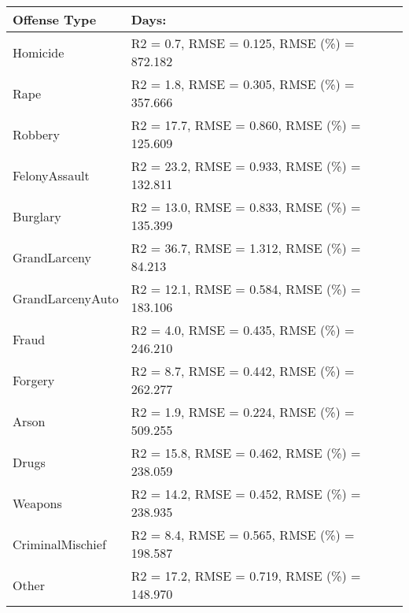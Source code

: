 \documentclass[10pt,journal,compsoc]{IEEEtran}
\begin{document}
\begin{tabular}{ |p{3cm}|p{4cm}|  }
 \hline
 Offense Type&Days:\\
  \hline
Homicide& R2 = 0.7, RMSE = 0.125, RMSE (\%) = 872.182\\
 \hline
Rape& R2 = 1.8, RMSE = 0.305, RMSE (\%) = 357.666\\
 \hline
Robbery &R2 = 17.7, RMSE = 0.860, RMSE (\%) = 125.609 \\
 \hline
FelonyAssault& R2 = 23.2, RMSE = 0.933, RMSE (\%) = 132.811\\
 \hline
Burglary &R2 = 13.0, RMSE = 0.833, RMSE (\%) = 135.399\\
 \hline
GrandLarceny &R2 = 36.7, RMSE = 1.312, RMSE (\%) = 84.213\\
 \hline
GrandLarcenyAuto &R2 = 12.1, RMSE = 0.584, RMSE (\%) = 183.106\\
 \hline
Fraud& R2 = 4.0, RMSE = 0.435, RMSE (\%) = 246.210\\
 \hline
Forgery &R2 = 8.7, RMSE = 0.442, RMSE (\%) = 262.277\\
 \hline
Arson &R2 = 1.9, RMSE = 0.224, RMSE (\%) = 509.255\\
 \hline
Drugs& R2 = 15.8, RMSE = 0.462, RMSE (\%) = 238.059\\
 \hline
Weapons& R2 = 14.2, RMSE = 0.452, RMSE (\%) = 238.935\\
 \hline
CriminalMischief& R2 = 8.4, RMSE = 0.565, RMSE (\%) = 198.587\\
 \hline
Other &R2 = 17.2, RMSE = 0.719, RMSE (\%) = 148.970\\
 \hline
\end{tabular}
\end{document}
